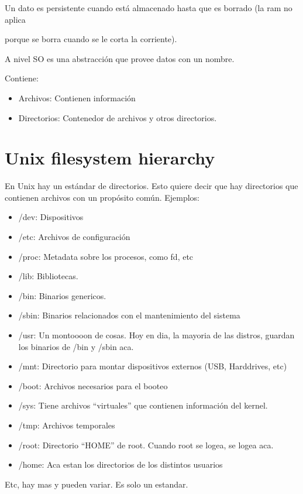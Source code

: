 \documentclass{article}
\begin{document}
Un dato es persistente cuando está almacenado hasta que es borrado (la
ram no aplica

porque se borra cuando se le corta la corriente).

A nivel SO es una abstracción que provee datos con un nombre.

Contiene:

\begin{itemize}
\item
  Archivos: Contienen información
\item
  Directorios: Contenedor de archivos y otros directorios.
\end{itemize}

\section{Unix filesystem hierarchy}

En Unix hay un estándar de directorios. Esto quiere decir que hay
directorios que contienen archivos con un propósito común. Ejemplos:

\begin{itemize}
\item
  /dev: Dispositivos
\item
  /etc: Archivos de configuración
\item
  /proc: Metadata sobre los procesos, como fd, etc
\item
  /lib: Bibliotecas.
\item
  /bin: Binarios genericos.
\item
  /sbin: Binarios relacionados con el mantenimiento del sistema
\item
  /usr: Un montoooon de cosas. Hoy en dia, la mayoria de las distros, guardan los binarios de /bin y /sbin aca.
\item
  /mnt: Directorio para montar dispositivos externos (USB, Harddrives, etc) 
\item
  /boot: Archivos necesarios para el booteo
\item
  /sys: Tiene archivos ``virtuales'' que contienen información del kernel.
\item
  /tmp: Archivos temporales
\item
  /root: Directorio ``HOME'' de root. Cuando root se logea, se logea aca.
\item
  /home: Aca estan los directorios de los distintos usuarios
\end{itemize}

Etc, hay mas y pueden variar. Es solo un estandar.
\end{document}
